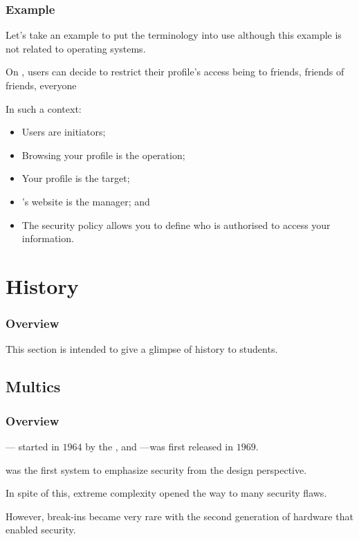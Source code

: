 \begin{frame}
  \frametitle{Example}

  Let's take an example to put the terminology into use although this
  example is not related to operating systems.

  \-

  On , users can decide to restrict their profile's access
  being to friends, friends of friends, everyone \etc{}

  \-

  In such a context:

  \begin{itemize}
    \item
      Users are initiators;
    \item
      Browsing your profile is the operation;
    \item
      Your profile is the target;
    \item
      's website is the manager; and
    \item
      The security policy allows you to define who is authorised to access
      your information.
  \end{itemize}
\end{frame}

%
%

\section{History}


\begin{frame}
  \frametitle{Overview}

  This section is intended to give a glimpse of history to students.
\end{frame}


\subsection{Multics}


\begin{frame}
  \frametitle{Overview}

  ---
  started in $1964$ by the ,  and
  ---was first released in $1969$.

  \-

   was the first system to emphasize security from the
  design perspective.

  \-

  In spite of this,  extreme complexity opened the way to many
  security flaws.

  \-

  However, break-ins became very rare with the second generation of hardware
  that enabled  security.
\end{frame}

